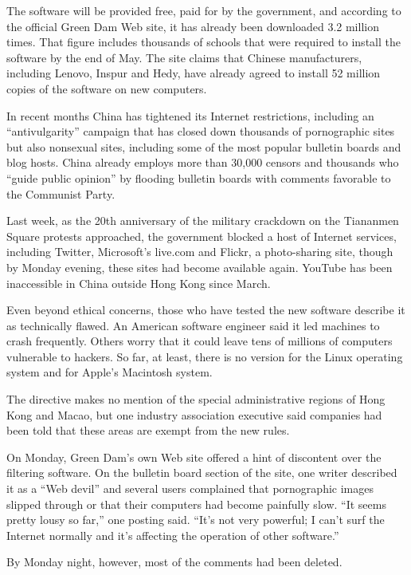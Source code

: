 \documentclass[12pt,a4paper,onecolumn]{article}
\begin{document}
The software will be provided free, paid for by the government, and according to the official Green
Dam Web site, it has already been downloaded 3.2 million times. That figure includes thousands of
schools that were required to install the software by the end of May. The site claims that Chinese
manufacturers, including Lenovo, Inspur and Hedy, have already agreed to install 52 million copies
of the software on new computers.

In recent months China has tightened its Internet restrictions, including an ``antivulgarity''
campaign that has closed down thousands of pornographic sites but also nonsexual sites, including
some of the most popular bulletin boards and blog hosts. China already employs more than 30,000
censors and thousands who ``guide public opinion'' by flooding bulletin boards with comments
favorable to the Communist Party.

Last week, as the 20th anniversary of the military crackdown on the Tiananmen Square protests
approached, the government blocked a host of Internet services, including Twitter, Microsoft's
live.com and Flickr, a photo-sharing site, though by Monday evening, these sites had become
available again. YouTube has been inaccessible in China outside Hong Kong since March.

Even beyond ethical concerns, those who have tested the new software describe it as technically
flawed. An American software engineer said it led machines to crash frequently. Others worry that it
could leave tens of millions of computers vulnerable to hackers. So far, at least, there is no
version for the Linux operating system and for Apple's Macintosh system.

The directive makes no mention of the special administrative regions of Hong Kong and Macao, but one
industry association executive said companies had been told that these areas are exempt from the new
rules.

On Monday, Green Dam's own Web site offered a hint of discontent over the filtering software. On the
bulletin board section of the site, one writer described it as a ``Web devil'' and several users
complained that pornographic images slipped through or that their computers had become painfully
slow. ``It seems pretty lousy so far,'' one posting said. ``It's not very powerful; I can't surf the
Internet normally and it's affecting the operation of other software.''

By Monday night, however, most of the comments had been deleted.
\end{document}
